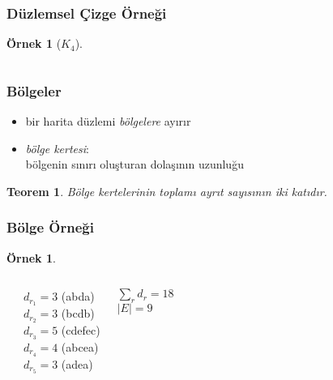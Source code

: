 \documentclass[dvipsnames]{beamer}
\theoremstyle{definition}
\theoremstyle{example}
\newtheorem{ornek}[theorem]{Örnek}
\theoremstyle{plain}
\newtheorem{teorem}[theorem]{Teorem}
\begin{document}
\begin{frame}
  \frametitle{Düzlemsel Çizge Örneği}

  \begin{ornek}[$K_4$]
    \begin{columns}
      \begin{center}
      \end{center}

      \begin{center}
      \end{center}
    \end{columns}
  \end{ornek}
\end{frame}

\begin{frame}
  \frametitle{Bölgeler}

  \begin{itemize}
    \item bir harita düzlemi \emph{bölgelere} ayırır
    \item \emph{bölge kertesi}:\\
      bölgenin sınırı oluşturan dolaşının uzunluğu
  \end{itemize}

  \pause
  \begin{teorem}
    Bölge kertelerinin toplamı ayrıt sayısının iki katıdır.
  \end{teorem}
\end{frame}

\begin{frame}
  \frametitle{Bölge Örneği}

  \begin{ornek}
    \begin{columns}
      \begin{center}
      \end{center}

      \pause
      $d_{r_1} = 3$ (abda)\\
      $d_{r_2} = 3$ (bcdb)\\
      $d_{r_3} = 5$ (cdefec)\\
      $d_{r_4} = 4$ (abcea)\\
      $d_{r_5} = 3$ (adea)

      \medskip
      $\sum_r d_r = 18$\\
      $|E| = 9$
    \end{columns}
  \end{ornek}
\end{frame}
\end{document}
